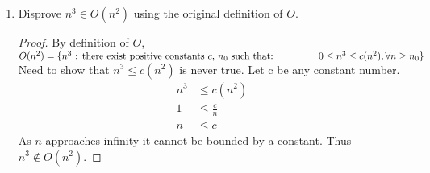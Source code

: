 \documentclass{article}
\begin{document}
\begin{enumerate}
\begin{proof}
\begin{align*}
                        100-30-20 &\leq 100\\
                        50 &\leq 100
                    \end{align*}
                    IH: Assume $k^2-3k-20\leq k^2$ for $k\geq 10$\\
                    Prove true for $k+1$.
                    \begin{align*}
                        (k+1)^2-3(k+1)-20 &\leq (k+1)^2 \\
                        k^2+2k+1-3k-3-20 &\leq (k+1)^2 \\
                        k^2-k-22 &\leq (k+1)^2 \\
                        k^2-k-22-2k+2k+2-2 &\leq (k+1)^2 \\
                        k^2-3k-20+2k-2 &\leq (k+1)^2 \\
                        k^2+2k-2 &\leq (k+1)^2 &&\text{Induction step}\\
                        k^2+2k-2 &\leq k^2+2k+1 \\
                        -2 &\leq 1
                    \end{align*}
                    This shows that $n^2-3n-20\in\Theta(n^2)$ is true with $c_1 = \frac{1}{2}$, $c_2 = 1$ for all $n \geq 10$
                \end{proof}
            \item Disprove $n^3\in O(n^2)$ using the original definition of $O$.
                \begin{proof}
                    By definition of $O$,\\$O(n^2) = \{n^3 \text{ : there exist positive constants } c \text{, } n_0 \text{ such that: }\\ 
                    \text{\hspace{1.5cm}}0\leq n^3\leq c(n^2), \forall n\geq n_0\}$\\
                    Need to show that $n^3\leq c(n^2)$ is never true. Let c be any constant number.
                    \begin{align*}
                        n^3 &\leq c(n^2)\\
                        1 &\leq \frac{c}{n} \\
                        n &\leq c
                    \end{align*}
                    As $n$ approaches infinity it cannot be bounded by a constant. Thus $n^3\not\in O(n^2)$.
                \end{proof}

\end{enumerate}
\end{document}
